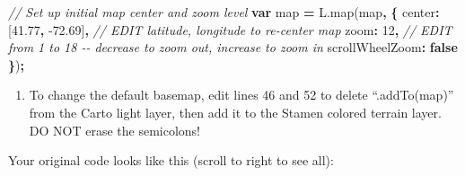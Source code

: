 \documentclass[
  english,
]{book}
\newenvironment{Shaded}{\begin{snugshade}}{\end{snugshade}}
\newcommand{\AttributeTok}[1]{\textcolor[rgb]{0.77,0.63,0.00}{#1}}
\newcommand{\CommentTok}[1]{\textcolor[rgb]{0.56,0.35,0.01}{\textit{#1}}}
\newcommand{\DataTypeTok}[1]{\textcolor[rgb]{0.13,0.29,0.53}{#1}}
\newcommand{\DecValTok}[1]{\textcolor[rgb]{0.00,0.00,0.81}{#1}}
\newcommand{\FloatTok}[1]{\textcolor[rgb]{0.00,0.00,0.81}{#1}}
\newcommand{\KeywordTok}[1]{\textcolor[rgb]{0.13,0.29,0.53}{\textbf{#1}}}
\newcommand{\NormalTok}[1]{#1}
\newcommand{\OperatorTok}[1]{\textcolor[rgb]{0.81,0.36,0.00}{\textbf{#1}}}
\newcommand{\StringTok}[1]{\textcolor[rgb]{0.31,0.60,0.02}{#1}}
\newcommand{\VariableTok}[1]{\textcolor[rgb]{0.00,0.00,0.00}{#1}}
\providecommand{\tightlist}{%
  \setlength{\itemsep}{0pt}\setlength{\parskip}{0pt}}
\begin{document}
\begin{Shaded}
\begin{Highlighting}[]
\CommentTok{// Set up initial map center and zoom level}
\KeywordTok{var}\NormalTok{ map }\OperatorTok{=} \VariableTok{L}\NormalTok{.}\AttributeTok{map}\NormalTok{(}\StringTok{\textquotesingle{}map\textquotesingle{}}\OperatorTok{,} \OperatorTok{\{}
  \DataTypeTok{center}\OperatorTok{:}\NormalTok{ [}\FloatTok{41.77}\OperatorTok{,} \FloatTok{{-}72.69}\NormalTok{]}\OperatorTok{,} \CommentTok{// EDIT latitude, longitude to re{-}center map}
  \DataTypeTok{zoom}\OperatorTok{:} \DecValTok{12}\OperatorTok{,}  \CommentTok{// EDIT from 1 to 18 {-}{-} decrease to zoom out, increase to zoom in}
  \DataTypeTok{scrollWheelZoom}\OperatorTok{:} \KeywordTok{false}
\OperatorTok{\}}\NormalTok{)}\OperatorTok{;}
\end{Highlighting}
\end{Shaded}

\begin{enumerate}
\def\labelenumi{\arabic{enumi})}
\setcounter{enumi}{14}
\tightlist
\item
  To change the default basemap, edit lines 46 and 52 to delete ``.addTo(map)'' from the Carto light layer, then add it to the Stamen colored terrain layer. DO NOT erase the semicolons!
\end{enumerate}

Your original code looks like this (scroll to right to see all):
\end{document}

